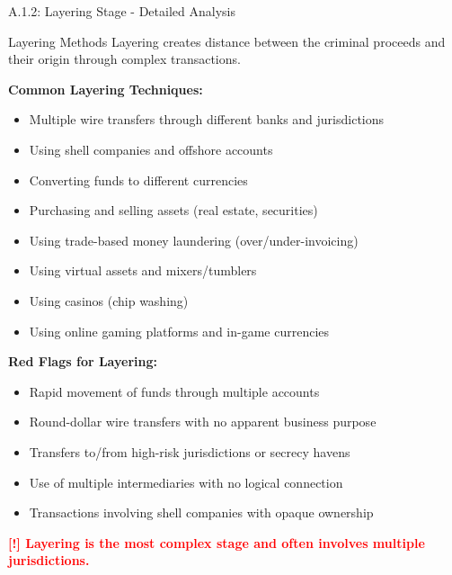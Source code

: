 \documentclass[11pt,a4paper]{beamer}
\newcommand{\redflag}[1]{\textcolor{red}{\textbf{[!] #1}}}
\begin{document}
	\begin{frame}{A.1.2: Layering Stage - Detailed Analysis}
		\begin{block}{Layering Methods}
			Layering creates distance between the criminal proceeds and their origin through complex transactions.
		\end{block}
		\textbf{Common Layering Techniques:}
		\begin{itemize}
			\item Multiple wire transfers through different banks and jurisdictions
			\item Using shell companies and offshore accounts
			\item Converting funds to different currencies
			\item Purchasing and selling assets (real estate, securities)
			\item Using trade-based money laundering (over/under-invoicing)
			\item Using virtual assets and mixers/tumblers
			\item Using casinos (chip washing)
			\item Using online gaming platforms and in-game currencies
		\end{itemize}
		\textbf{Red Flags for Layering:}
		\begin{itemize}
			\item Rapid movement of funds through multiple accounts
			\item Round-dollar wire transfers with no apparent business purpose
			\item Transfers to/from high-risk jurisdictions or secrecy havens
			\item Use of multiple intermediaries with no logical connection
			\item Transactions involving shell companies with opaque ownership
		\end{itemize}
		\redflag{Layering is the most complex stage and often involves multiple jurisdictions.}
	\end{frame}
	
\end{document}
